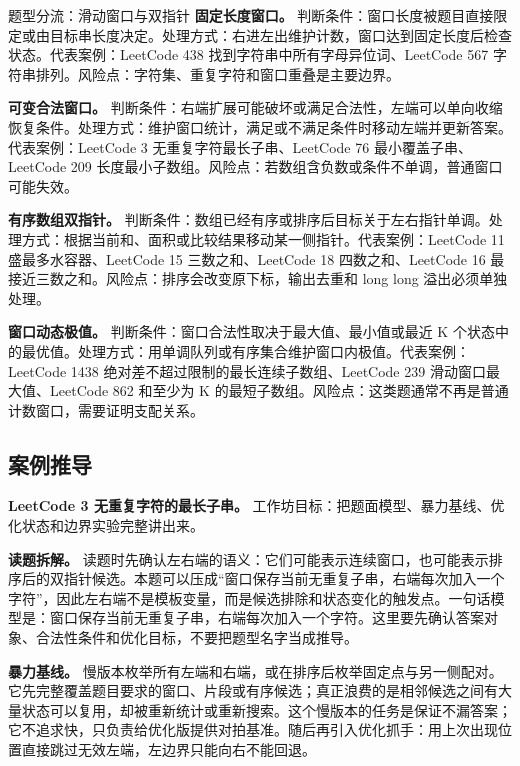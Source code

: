 \begin{principlebox}{题型分流：滑动窗口与双指针}
\textbf{固定长度窗口。}
判断条件：窗口长度被题目直接限定或由目标串长度决定。处理方式：右进左出维护计数，窗口达到固定长度后检查状态。代表案例：LeetCode 438 找到字符串中所有字母异位词、LeetCode 567 字符串排列。风险点：字符集、重复字符和窗口重叠是主要边界。

\textbf{可变合法窗口。}
判断条件：右端扩展可能破坏或满足合法性，左端可以单向收缩恢复条件。处理方式：维护窗口统计，满足或不满足条件时移动左端并更新答案。代表案例：LeetCode 3 无重复字符最长子串、LeetCode 76 最小覆盖子串、LeetCode 209 长度最小子数组。风险点：若数组含负数或条件不单调，普通窗口可能失效。

\textbf{有序数组双指针。}
判断条件：数组已经有序或排序后目标关于左右指针单调。处理方式：根据当前和、面积或比较结果移动某一侧指针。代表案例：LeetCode 11 盛最多水容器、LeetCode 15 三数之和、LeetCode 18 四数之和、LeetCode 16 最接近三数之和。风险点：排序会改变原下标，输出去重和 long long 溢出必须单独处理。

\textbf{窗口动态极值。}
判断条件：窗口合法性取决于最大值、最小值或最近 K 个状态中的最优值。处理方式：用单调队列或有序集合维护窗口内极值。代表案例：LeetCode 1438 绝对差不超过限制的最长连续子数组、LeetCode 239 滑动窗口最大值、LeetCode 862 和至少为 K 的最短子数组。风险点：这类题通常不再是普通计数窗口，需要证明支配关系。

\end{principlebox}

\subsection{案例推导}

\noindent\textbf{LeetCode 3 无重复字符的最长子串。} 工作坊目标：把题面模型、暴力基线、优化状态和边界实验完整讲出来。

\textbf{读题拆解。} 读题时先确认左右端的语义：它们可能表示连续窗口，也可能表示排序后的双指针候选。本题可以压成“窗口保存当前无重复子串，右端每次加入一个字符”，因此左右端不是模板变量，而是候选排除和状态变化的触发点。一句话模型是：窗口保存当前无重复子串，右端每次加入一个字符。这里要先确认答案对象、合法性条件和优化目标，不要把题型名字当成推导。

\textbf{暴力基线。} 慢版本枚举所有左端和右端，或在排序后枚举固定点与另一侧配对。它先完整覆盖题目要求的窗口、片段或有序候选；真正浪费的是相邻候选之间有大量状态可以复用，却被重新统计或重新搜索。这个慢版本的任务是保证不漏答案；它不追求快，只负责给优化版提供对拍基准。随后再引入优化抓手：用上次出现位置直接跳过无效左端，左边界只能向右不能回退。

